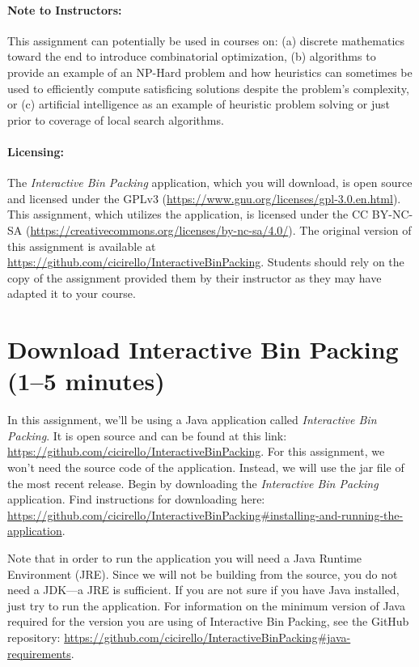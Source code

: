 \documentclass[11pt,letterpaper]{article}
\begin{document}
\paragraph*{Note to Instructors:} This assignment can potentially be used
in courses on: (a) discrete mathematics toward the end to introduce 
combinatorial optimization, (b) algorithms to provide an example of an
NP-Hard problem and how heuristics can sometimes be used to efficiently
compute satisficing solutions despite the problem's complexity, or (c)
artificial intelligence as an example of heuristic problem solving or
just prior to coverage of local search algorithms.

\paragraph*{Licensing:} The {\em Interactive Bin Packing} application,
which you will download, is open source and licensed under the GPLv3 
(\url{https://www.gnu.org/licenses/gpl-3.0.en.html}). This assignment,
which utilizes the application, is licensed under the CC BY-NC-SA
(\url{https://creativecommons.org/licenses/by-nc-sa/4.0/}). The original
version of this assignment is available 
at \url{https://github.com/cicirello/InteractiveBinPacking}. Students 
should rely on the copy of the assignment provided them by their instructor
as they may have adapted it to your course. 

\section{Download Interactive Bin Packing (1--5 minutes)}\label{sec:download}
In this assignment, we'll be using a Java application 
called {\em Interactive Bin Packing}. It is open source and
can be found at this 
link: \url{https://github.com/cicirello/InteractiveBinPacking}.
For this assignment, we won't need the source code of the application.
Instead, we will use the jar file of the most recent release.
Begin by downloading the {\em Interactive Bin Packing}
application. Find instructions for downloading
here: \url{https://github.com/cicirello/InteractiveBinPacking#installing-and-running-the-application}. 

Note that in order to run the application you will need
a Java Runtime Environment (JRE). Since we will
not be building from the source, you do not need a JDK---a JRE is sufficient.
If you are not sure if you have Java installed, just try to run the 
application. For information on the minimum version of Java required for the
version you are using of Interactive Bin Packing, see the GitHub repository:
\url{https://github.com/cicirello/InteractiveBinPacking#java-requirements}. 
\end{document}

